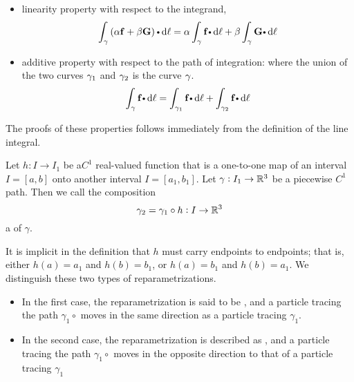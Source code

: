   \begin{prop} \mbox{}
\begin{itemize}
 \item  linearity property with respect to the integrand,
\[  \dint_\caminho  \left(\alpha \funvect{f}+\beta \funvect{G} \right) \bp \dif \ell= \alpha  \dint_\caminho  \funvect{f}\bp \dif \ell+
 \beta  \dint_\caminho  \funvect{G} \bp \dif \ell\]
\item  additive property with respect to the path of integration:
where the union of the two curves $\gamma_1$ and $\gamma_2$ is the curve $\gamma$. 
\[\dint_\caminho  \funvect{f}\bp \dif \ell=\dint_{\caminho_1}  \funvect{f}\bp \dif \ell+\dint_{\caminho_2}  \funvect{f}\bp \dif \ell\]
\end{itemize}
  \end{prop}
  The proofs of these properties follows immediately from the definition of the line integral.
  

\begin{df}
Let $h: I \to I_1$ be a$ C^1$ real-valued function that is a one-to-one
map of an interval $I = [a, b]$ onto another interval
$I = [a_1 , b_1 ]$. Let $\gamma: I_1 \to \mathbb{R}^3$ be
a piecewise $C^1$ path. Then we call the composition
\[\gamma_2=\gamma_1\circ h:I\to\mathbb{R}^3\]
a  of $\gamma$.

\end{df}

It is implicit in the definition that $h$ must carry endpoints to endpoints; that is,
either $h(a) = a_1$ and $h(b) = b_1$, or $h(a) = b_1$ and 
$h(b) = a_1$. We distinguish these two
types of reparametrizations.
\begin{itemize}
 \item In the first case, the reparametrization is said to be , and a
particle tracing the path $\gamma_1\circ $ moves in the same direction as a particle tracing $\gamma_1$.
 \item   In
the second case, the reparametrization is described as , and a
particle tracing the path $\gamma_1\circ$  moves in the opposite direction to that of a particle
tracing $\gamma_1$
\end{itemize}

